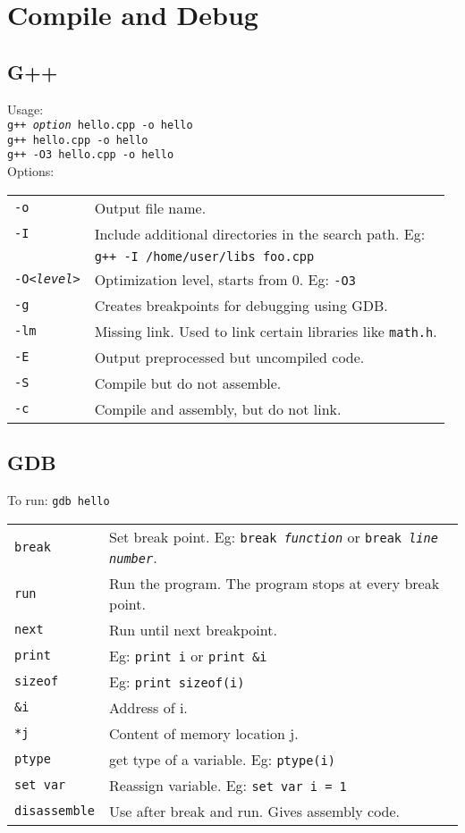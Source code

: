 \section{Compile and Debug}

\subsection{G++}
Usage:\\
\texttt{g++ \textit{option} hello.cpp -o hello}\\
\texttt{g++ hello.cpp -o hello}\\
\texttt{g++ -O3 hello.cpp -o hello}\\
Options:\\
\begin{tabularx}{\linewidth}{lX}
\texttt{-o} & Output file name.\\
\texttt{-I} & Include additional directories in the search path. Eg:\\
& \texttt{g++ -I /home/user/libs foo.cpp}\\
\texttt{-O\textit{<level>}} & Optimization level, starts from 0. Eg: \texttt{-O3}\\
\texttt{-g} & Creates breakpoints for debugging using GDB.\\
\texttt{-lm} & Missing link. Used to link certain libraries like \texttt{math.h}.\\
\texttt{-E} & Output preprocessed but uncompiled code.\\
\texttt{-S} & Compile but do not assemble.\\
\texttt{-c} & Compile and assembly, but do not link.\\
\end{tabularx}

\subsection{GDB}
To run: \texttt{gdb hello}\\
\begin{tabularx}{\linewidth}{lX}
\texttt{break} & Set break point. Eg: \texttt{break \textit{function}} or \texttt{break \textit{line number}}.\\
\texttt{run} & Run the program. The program stops at every break point.\\
\texttt{next} & Run until next breakpoint.\\
\texttt{print} & Eg: \texttt{print i} or \texttt{print \&i}\\
\texttt{sizeof} & Eg: \texttt{print sizeof(i)}\\
\texttt{\&i} & Address of i.\\
\texttt{*j} & Content of memory location j.\\
\texttt{ptype} & get type of a variable. Eg: \texttt{ptype(i)}\\
\texttt{set var} & Reassign variable. Eg: \texttt{set var i = 1}\\
\texttt{disassemble} & Use after break and run. Gives assembly code.\\
\end{tabularx}

